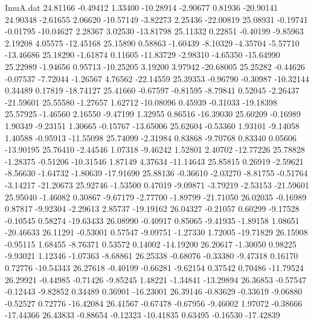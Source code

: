 \begin{filecontents}{ImuA.dat}
  24.81166   -0.49412    1.33400  -10.28914   -2.90677    0.81936  -20.90141
  24.90348   -2.61655    2.06620  -10.57149   -3.82273    2.25436  -22.00819
  25.08931   -0.19741   -0.01795  -10.04627    2.28367    3.02530  -13.81798
  25.11332    0.22851   -0.40199   -9.85963    2.19208    4.05575  -12.45168
  25.15890    0.58863   -1.60439   -8.10329   -4.35704   -5.57710  -13.46686
  25.18290   -1.61874    0.11605  -11.83729   -2.98310   -4.65350  -15.64990
  25.22989   -1.94656    0.95713  -10.25205    3.19200    3.97942  -20.68005
  25.25282   -0.44626   -0.07537   -7.72044   -1.26567    4.76562  -22.14559
  25.39353   -0.96790   -0.30987  -10.32144    0.34489    0.17819  -18.74127
  25.41660   -0.67597   -0.81595   -8.79841    0.52045   -2.26437  -21.59601
  25.55580   -1.27657    1.62712  -10.08096    0.45939   -0.31033  -19.18398
  25.57925   -1.46560    2.16550   -9.47199    1.32955    0.86516  -16.39030
  25.60209   -0.16989    1.90349   -9.23151    1.30665   -0.15767  -13.65006
  25.62604   -0.53360    1.93101   -9.14058    1.40588   -0.95913  -11.55098
  25.74099   -2.31984    0.83868   -9.70768    0.83340    0.05606  -13.90195
  25.76410   -2.44546    1.07318   -9.46242    1.52801    2.40702  -12.77226
  25.78828   -1.28375   -0.51206  -10.31546    1.87149    4.37634  -11.14643
  25.85815    0.26919   -2.59621   -8.56630   -1.64732   -1.80639  -17.91690
  25.88136   -0.36610   -2.03270   -8.81755   -0.51764   -3.14217  -21.20673
  25.92746   -1.53500    0.47019   -9.09871   -3.79219   -2.53153  -21.59601
  25.95040   -1.46082    0.30867   -9.67179   -2.77700   -1.89799  -21.71050
  26.02035   -0.16989    0.87817   -9.92304   -2.29613    2.85737  -19.19162
  26.04327   -0.21057    0.60299   -9.17528   -0.10545    0.58274  -19.63433
  26.08990   -0.40917    0.85065   -9.41935   -1.89158    1.08651  -20.46633
  26.11291   -0.53001    0.57547   -9.09751   -1.27330    1.72005  -19.71829
  26.15908   -0.95115    1.68455   -8.76371    0.53572    0.14002  -14.19200
  26.20617   -1.30050    0.98225   -9.93021    1.12346   -1.07363   -8.68861
  26.25338   -0.68076   -0.33380   -9.47318    0.16170    0.72776  -10.54343
  26.27618   -0.40199   -0.66281   -9.62154    0.37542    0.70486  -11.79524
  26.29921   -0.44985   -0.71426   -9.85245    1.48221   -1.34841  -13.29894
  26.36853   -0.57547   -0.12443   -9.82852    0.34489    0.36901  -16.23001
  26.39146   -0.83629   -0.33619   -9.06880   -0.52527    0.72776  -16.42084
  26.41567   -0.67478   -0.67956   -9.46002    1.97072   -0.38666  -17.44366
  26.43833   -0.88654   -0.12323  -10.41835    0.63495   -0.16530  -17.42839

\end{filecontents}
